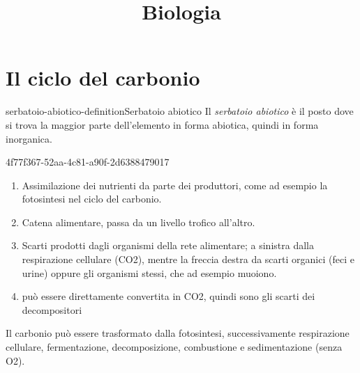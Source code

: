 \documentclass[preview]{standalone}
\begin{document}
\title{Biologia}
\genpage

\section{Il ciclo del carbonio}

\begin{snippetdefinition}{serbatoio-abiotico-definition}{Serbatoio abiotico}
    Il \textit{serbatoio abiotico} 
    è il posto dove si trova la maggior parte dell'elemento in forma abiotica,
    quindi in forma inorganica.
\end{snippetdefinition}



\begin{snippet}{4f77f367-52aa-4c81-a90f-2d6388479017}
    \begin{enumerate}
        \item Assimilazione dei nutrienti da parte dei produttori, come ad esempio la fotosintesi nel ciclo del carbonio. 
        \item Catena alimentare, passa da un livello trofico all'altro. 
        \item Scarti prodotti dagli organismi della rete alimentare; a sinistra dalla respirazione cellulare (CO2), mentre la freccia destra da scarti organici (feci e urine) oppure gli organismi stessi, che ad esempio muoiono.
        \item può essere direttamente convertita in CO2, quindi sono gli scarti dei decompositori
    \end{enumerate}
    
    Il carbonio può essere trasformato dalla fotosintesi, successivamente 
    respirazione cellulare, fermentazione, decomposizione, combustione e sedimentazione (senza O2).
\end{snippet}
\end{document}
